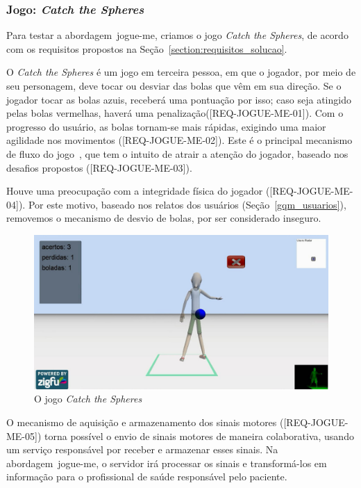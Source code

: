 \subsubsection{Jogo: \textit{Catch the Spheres}}\label{jogo_catch}
Para testar a abordagem~\ac{jogue-me}, criamos o jogo \textit{Catch the Spheres}, de acordo com os requisitos propostos na Seção~\ref{section:requisitos_solucao}.  

O \textit{Catch the Spheres} é um jogo em terceira pessoa, em que o jogador, por meio de seu personagem, deve tocar ou desviar das bolas que vêm em sua direção. Se o jogador tocar as bolas azuis, receberá uma pontuação por isso; caso seja atingido pelas bolas vermelhas, haverá uma penalização([REQ-JOGUE-ME-01]). Com o progresso do usuário, as bolas tornam-se mais rápidas, exigindo uma maior agilidade nos movimentos ([REQ-JOGUE-ME-02]). Este é o principal mecanismo de fluxo do jogo~\cite{sweetser2005-gameflow}, que tem o intuito de atrair a atenção do jogador, baseado nos desafios propostos ([REQ-JOGUE-ME-03]). 

Houve uma preocupação com a integridade física do jogador ([REQ-JOGUE-ME-04]). Por este motivo, baseado nos relatos dos usuários (Seção~\ref{gqm_usuarios}), removemos o mecanismo de desvio de bolas, por ser considerado inseguro.

\begin{figure}[!htb]
     \centering
     \includegraphics[width=.8\textwidth]{./img/catch-the-spheres.png}
     \caption{O jogo \emph{Catch the Spheres}}
     \label{img:catch}
\end{figure}

O mecanismo de aquisição e armazenamento dos sinais motores ([REQ-JOGUE-ME-05]) torna possível o envio de sinais motores de maneira colaborativa, usando um serviço responsável por receber e armazenar esses sinais. Na abordagem~\ac{jogue-me}, o servidor irá processar os sinais e transformá-los em informação para o profissional de saúde responsável pelo paciente.


